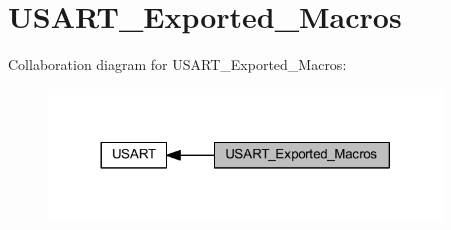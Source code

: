 \hypertarget{group___u_s_a_r_t___exported___macros}{}\section{U\+S\+A\+R\+T\+\_\+\+Exported\+\_\+\+Macros}
\label{group___u_s_a_r_t___exported___macros}
Collaboration diagram for U\+S\+A\+R\+T\+\_\+\+Exported\+\_\+\+Macros\+:
\nopagebreak
\begin{figure}[H]
\begin{center}
\leavevmode
\includegraphics[width=296pt]{group___u_s_a_r_t___exported___macros}
\end{center}
\end{figure}
